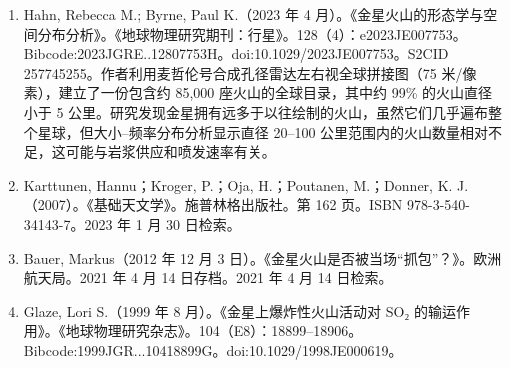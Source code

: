 \begin{enumerate}
\item Hahn, Rebecca M.; Byrne, Paul K.（2023 年 4 月）。《金星火山的形态学与空间分布分析》。《地球物理研究期刊：行星》。128（4）：e2023JE007753。Bibcode:2023JGRE..12807753H。doi:10.1029/2023JE007753。S2CID 257745255。作者利用麦哲伦号合成孔径雷达左右视全球拼接图（75 米/像素），建立了一份包含约 85,000 座火山的全球目录，其中约 99\% 的火山直径小于 5 公里。研究发现金星拥有远多于以往绘制的火山，虽然它们几乎遍布整个星球，但大小–频率分布分析显示直径 20–100 公里范围内的火山数量相对不足，这可能与岩浆供应和喷发速率有关。
\item Karttunen, Hannu；Kroger, P.；Oja, H.；Poutanen, M.；Donner, K. J.（2007）。《基础天文学》。施普林格出版社。第 162 页。ISBN 978-3-540-34143-7。2023 年 1 月 30 日检索。
\item Bauer, Markus（2012 年 12 月 3 日）。《金星火山是否被当场“抓包”？》。欧洲航天局。2021 年 4 月 14 日存档。2021 年 4 月 14 日检索。
\item Glaze, Lori S.（1999 年 8 月）。《金星上爆炸性火山活动对 SO₂ 的输运作用》。《地球物理研究杂志》。104（E8）：18899–18906。Bibcode:1999JGR...10418899G。doi:10.1029/1998JE000619。


\end{enumerate}
